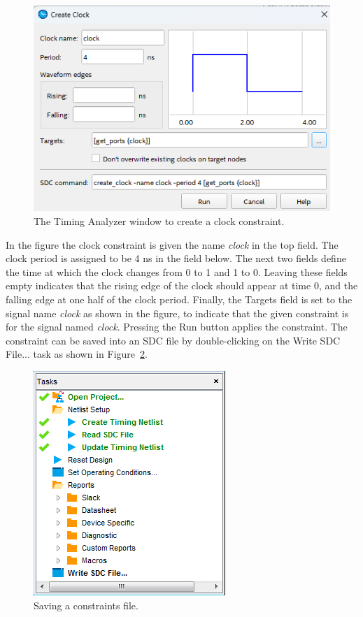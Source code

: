 \documentclass[11pt, twoside, pdftex]{article}
\begin{document}
\begin{figure}[H]
\begin{center}
\includegraphics[scale=0.65]{figures/figure12.png}
\end{center}
\caption{The Timing Analyzer window to create a clock constraint.}
\label{fig:12}
\end{figure}

In the figure the clock constraint is given the name {\it clock} in the top field. The
clock period is assigned to be 4 ns in the field below. The next two fields define the time
at which the clock changes from 0 to 1 and 1 to 0. Leaving these fields empty indicates that 
the rising edge of the clock should appear at time 0, and the falling edge at one half of 
the clock period. Finally, the {\sf Targets} field is set to the signal name {\it clock} as 
shown in the figure, to indicate that the given constraint is for the signal named {\it clock}. 
Pressing the {\sf Run} button applies the constraint. The constraint can be saved into an SDC file by double-clicking on the {\sf Write SDC File...} task as 
shown in Figure~\ref{fig:13}.

\begin{figure}[H]
\begin{center}
\includegraphics[scale=0.6]{figures/figure13.png}
\end{center}
\caption{Saving a constraints file.}
\label{fig:13}
\end{figure}
\end{document}

